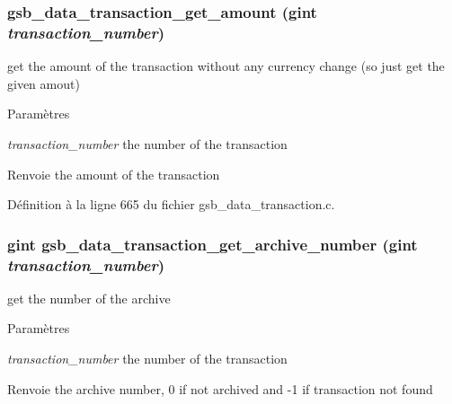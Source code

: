 \subsubsection[{gsb\_\-data\_\-transaction\_\-get\_\-amount}]{ gsb\_\-data\_\-transaction\_\-get\_\-amount (gint {\em transaction\_\-number})}\label{gsb__data__transaction_8h_a632c5ba71e742b3ac063b4b3207cf032}
get the amount of the transaction without any currency change (so just get the given amout)


\begin{DoxyParams}{Paramètres}
\item[{\em transaction\_\-number}]the number of the transaction\end{DoxyParams}
\begin{DoxyReturn}{Renvoie}
the amount of the transaction 
\end{DoxyReturn}


Définition à la ligne 665 du fichier gsb\_\-data\_\-transaction.c.

\subsubsection[{gsb\_\-data\_\-transaction\_\-get\_\-archive\_\-number}]{\setlength{\rightskip}{0pt plus 5cm}gint gsb\_\-data\_\-transaction\_\-get\_\-archive\_\-number (gint {\em transaction\_\-number})}\label{gsb__data__transaction_8h_a5dfc3ab337c363b46380bf962a97d8d2}
get the number of the archive


\begin{DoxyParams}{Paramètres}
\item[{\em transaction\_\-number}]the number of the transaction\end{DoxyParams}
\begin{DoxyReturn}{Renvoie}
the archive number, 0 if not archived and -\/1 if transaction not found 
\end{DoxyReturn}


